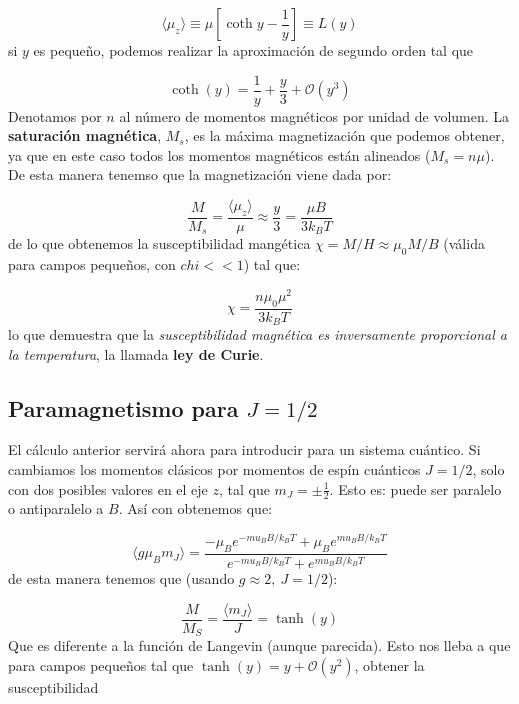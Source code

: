 \documentclass[12pt,a4paper]{book}
\numberwithin{equation}{section}
\numberwithin{figure}{section}
\newcommand{\ccorchetes}[1]{\left[ #1  \right]}
\begin{document}
\begin{equation}
\langle \mu_z \rangle \equiv \mu \ccorchetes{\coth y - \frac{1}{y}} \equiv L(y)
\end{equation}
si $y$ es pequeño, podemos realizar la aproximación de segundo orden tal que

$$\coth (y) = \frac{1}{y} + \frac{y}{3} + \mathcal{O} (y^3)$$
Denotamos por $n$ al número de momentos magnéticos por unidad de volumen. La \textbf{saturación magnética}, $M_s$, es la máxima magnetización que podemos obtener, ya que en este caso todos los momentos magnéticos están alineados ($M_s = n \mu$). De esta manera tenemso que la magnetización viene dada por:

\begin{equation}
\frac{M}{M_s} = \frac{\langle \mu_z \rangle}{\mu} \approx \frac{y}{3} = \frac{\mu B}{3 k_B T}
\end{equation}
de lo que obtenemos la susceptibilidad mangética $\chi = M/H \approx \mu_0 M / B$ (válida para campos pequeños, con $chi << 1$) tal que:

\begin{equation}
\chi = \frac{n \mu_0 \mu^2}{3 k_B T}
\end{equation}
lo que demuestra que la \textit{susceptibilidad magnética es inversamente proporcional a la temperatura}, la llamada \textbf{ley de Curie}. 

\subsection{Paramagnetismo para $J=1/2$}

El cálculo anterior servirá ahora para introducir para un sistema cuántico. Si cambiamos los momentos clásicos por momentos de espín cuánticos $J=1/2$, solo con dos posibles valores en el eje $z$, tal que $m_J = \pm \frac{1}{2}$. Esto es: puede ser paralelo o antiparalelo a $B$. Así con obtenemos que:

\begin{equation}
\langle g \mu_B m_J \rangle = \frac{- \mu_B e^{-mu_B B / k_B T}+\mu_B e^{mu_B B / k_B T}}{e^{-mu_B B / k_B T}+e^{mu_B B / k_B T}}
\end{equation}
de esta manera tenemos que (usando $g \approx 2, \ J=1/2$):

\begin{equation}
\frac{M}{M_S} = \frac{\langle m_J \rangle}{J} = \tanh (y)
\end{equation}
Que es diferente a la función de Langevin (aunque parecida). Esto nos lleba a que para campos pequeños tal que $\tanh (y) = y + \mathcal{O}(y^2)$, obtener la susceptibilidad
\end{document}

